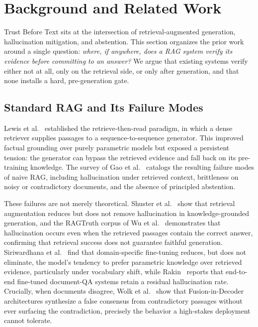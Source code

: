 \section{Background and Related Work}
\label{sec:related}

Trust Before Text sits at the intersection of retrieval-augmented
generation, hallucination mitigation, and abstention. This section
organizes the prior work around a single question: \textit{where, if
anywhere, does a RAG system verify its evidence before committing to an
answer?} We argue that existing systems verify either not at all, only on
the retrieval side, or only after generation, and that none installs a
hard, pre-generation gate.

\subsection{Standard RAG and Its Failure Modes}
Lewis et al.~\cite{lewis2020rag} established the retrieve-then-read
paradigm, in which a dense retriever supplies passages to a
sequence-to-sequence generator. This improved factual grounding over
purely parametric models but exposed a persistent tension: the generator
can bypass the retrieved evidence and fall back on its pre-training
knowledge. The survey of Gao et al.~\cite{gao2023rag_survey} catalogs the
resulting failure modes of naive RAG, including hallucination under
retrieved context, brittleness on noisy or contradictory documents, and
the absence of principled abstention.

These failures are not merely theoretical. Shuster et
al.~\cite{shuster2021retrieval} show that retrieval augmentation reduces
but does not remove hallucination in knowledge-grounded generation, and
the RAGTruth corpus of Wu et al.~\cite{wu2024ragtruth} demonstrates that
hallucination occurs even when the retrieved passages contain the correct
answer, confirming that retrieval success does not guarantee faithful
generation. Siriwardhana et al.~\cite{siriwardhana2023rag} find that
domain-specific fine-tuning reduces, but does not eliminate, the model's
tendency to prefer parametric knowledge over retrieved evidence,
particularly under vocabulary shift, while Rakin~\cite{rakin2024rag}
reports that end-to-end fine-tuned document-QA systems retain a residual
hallucination rate. Crucially, when documents disagree, Wolk et
al.~\cite{wolk2025clinical} show that Fusion-in-Decoder architectures
synthesize a false consensus from contradictory passages without ever
surfacing the contradiction, precisely the behavior a high-stakes
deployment cannot tolerate.

